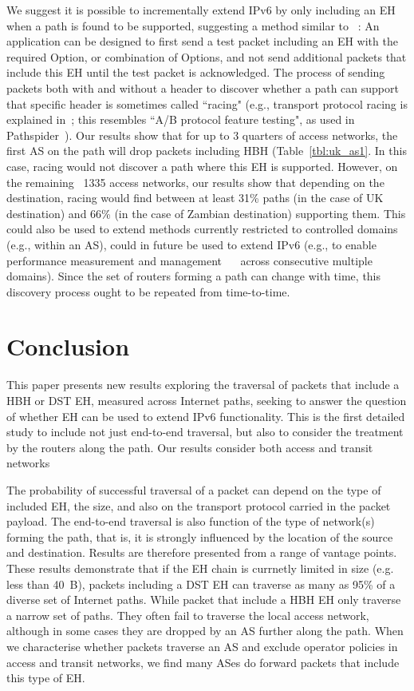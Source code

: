 \documentclass[conference]{IEEEtran}
\begin{document}
We suggest it is possible to incrementally extend IPv6 by only including an EH when a path is found to be supported,
suggesting a method similar to ~\cite{rfc9268}:
An application can be designed to first send a test packet including an EH with the required Option, or combination of Options, and not send additional packets that include this EH until the test packet is acknowledged. The process of sending packets both with and without a header to discover whether a path can support that specific header is sometimes called ``racing" (e.g., transport protocol racing is explained in~\cite{ietf-taps-arch-18}; this resembles ``A/B protocol feature testing", as used in Pathspider~\cite{learmonth2016pathspider}). Our results show that for up to 3 quarters of access networks, the first AS on the path will drop packets including HBH (Table~\ref{tbl:uk_as1}. In this case, racing would not discover a path where this EH is supported. However, on the remaining ~1335 access networks, our results show that depending on the destination, racing would find between at least 31\% paths (in the case of UK destination) and 66\% (in the case of Zambian destination) supporting them.
This could also be used to extend methods currently restricted to controlled domains (e.g.,  within an AS), could in future be used to extend IPv6 (e.g., to enable performance measurement and management ~\cite{rfc8250}~\cite{ietf-ippm-ioam-ipv6-options-10} across consecutive multiple domains).
Since the set of routers forming a path can change with time, this discovery process ought to be repeated from time-to-time. 

 
\section{Conclusion}
\label{sec:conclusion}

This paper presents new results exploring the traversal of packets that include a HBH or DST EH, measured across Internet paths, seeking to answer the question of whether EH can be used to extend IPv6 functionality. This is the first detailed study to include not just end-to-end traversal, but also to consider the treatment by the routers along the path. Our results consider both access and transit networks

The probability of successful traversal of a packet can depend on the type of included EH, the size, and also on the transport protocol carried in the packet payload. The end-to-end traversal is also function of the type of network(s) forming the path, that is, it is strongly influenced by the location of the source and destination. Results are therefore presented from a range of vantage points.
These results demonstrate that if the EH chain is currnetly limited in size (e.g. less than 40~B), packets including a DST EH can traverse as many as
95\% of a diverse set of Internet paths. While packet that include a HBH EH only traverse a narrow set of paths. They often fail to traverse the local access network, although in some cases they are dropped by an AS further along the path. When we characterise whether packets traverse an AS and exclude operator policies in access and transit networks, we find many ASes do forward packets that include this type of EH.
\end{document}
